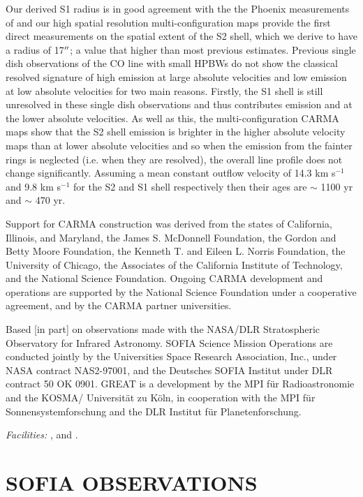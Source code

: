 \documentclass[iop]{emulateapj}
\begin{document}
Our derived S1 radius is in good agreement with the the Phoenix measurements of \cite{2009AJ....137.3558S} and our high spatial resolution multi-configuration maps provide the first direct measurements on the spatial extent of the S2 shell, which we derive to have a radius of 17$\mbox{$^{\prime\prime}$}$; a value that higher than most previous estimates. Previous single dish observations of the CO line with small HPBWs do not show the classical resolved  signature of high emission at large absolute velocities and low emission at low absolute velocities for two main reasons. Firstly, the S1 shell is still unresolved in these single dish observations and thus contributes emission and at the lower absolute velocities. As well as this, the multi-configuration CARMA maps show that the S2 shell emission is brighter in the higher absolute velocity maps than at lower absolute velocities and so when the emission from the fainter rings is neglected (i.e. when they are resolved), the overall line profile does not change significantly. Assuming a mean constant outflow velocity of 14.3 km s${}^{-1}$ and 9.8 km s${}^{-1}$ for the S2 and S1 shell respectively then their ages are $\sim$ 1100 yr and $\sim$ 470 yr. 

\acknowledgments

Support for CARMA construction was derived from the states of California, Illinois, and
Maryland, the James S. McDonnell Foundation, the Gordon and Betty Moore Foundation, the
Kenneth T. and Eileen L. Norris Foundation, the University of Chicago, the Associates of the
California Institute of Technology, and the National Science Foundation. Ongoing CARMA
development and operations are supported by the National Science Foundation under a
cooperative agreement, and by the CARMA partner universities.

Based [in part] on observations made with the NASA/DLR Stratospheric Observatory for Infrared Astronomy. SOFIA Science Mission Operations are conducted jointly by the Universities Space Research Association, Inc., under NASA contract NAS2-97001, and the Deutsches SOFIA Institut under DLR contract 50 OK 0901. GREAT is a development by the MPI für Radioastronomie and the KOSMA/ Universität zu Köln, in cooperation with the MPI für Sonnensystemforschung and the DLR Institut für Planetenforschung.

{\it Facilities:} ,  and .



\appendix
\section{SOFIA OBSERVATIONS}
\end{document}
